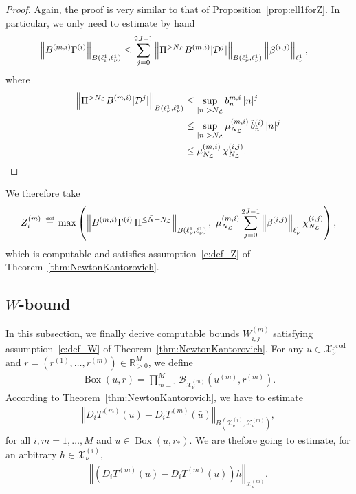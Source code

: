 \documentclass[10pt,a4paper]{article}
\theoremstyle{plain}
\newcommand{\RR}{\mathbb R}
\newcommand{\B}{\mathcal{B}}
\renewcommand{\B}{\mathcal{B}}
\renewcommand{\L}{\mathcal{L}}
\newcommand{\D}{\mathcal{D}}
\newcommand{\X}{\mathcal{X}}
\newcommand{\bu}{\bar{u}}
\newcommand{\bN}{\bar{N}}
\newcommand{\1}{\mathbf{1}}
\newcommand{\rstar}{r_*}
\newcommand{\pprod}{\mathrm{prod}}
\newcommand{\bydef}{\,\stackrel{\mbox{\tiny\textnormal{\raisebox{0ex}[0ex][0ex]{def}}}}{=}\,}
\DeclareMathOperator{\bbox}{Box}
\newcommand{\NL}{N_{\text{\tiny{$\L$}}}}
\begin{document}
%
\begin{proof}
Again, the proof is very similar to that of Proposition~\ref{prop:ell1forZ}. In particular, we only need to estimate by hand
\begin{align*}
\left\Vert B^{(m,i)}\Gamma^{(i)} \right\Vert_{B(\ell^1_\nu,\ell^1_\nu)} &\leq \sum_{j=0}^{2J-1} \left\Vert \Pi^{> \NL} B^{(m,i)} \vert \D^{j}\vert \right\Vert_{B(\ell^1_\nu,\ell^1_\nu)} \left\Vert \beta^{(i,j)}  \right\Vert_{\ell^1_\nu},
\end{align*}
where
\begin{align*}
\left\Vert \Pi^{> \NL} B^{(m,i)} \vert \D^{j}\vert \right\Vert_{B(\ell^1_\nu,\ell^1_\nu)} &\leq \sup_{\vert n\vert >\NL} b^{m,i}_n\, \vert n\vert^j \\
&\leq \sup_{\vert n\vert >\NL} \mu^{(m,i)}_{\NL}\, \tilde{b}^{(i)}_n\, \vert n\vert^j \\
&\leq  \mu^{(m,i)}_{\NL}\, \chi^{(i,j)}_{\NL}. \qedhere
\end{align*}
\end{proof}
We therefore take
\begin{align*}
Z^{(m)}_i \bydef \max \left(\left\Vert B^{(m,i)} \Gamma^{(i)} \,\Pi^{\leq \bN+\NL}\right\Vert_{B(\ell^1_\nu,\ell^1_\nu)},\ \mu^{(m,i)}_{\NL}\sum_{j=0}^{2J-1} \left\Vert \beta^{(i,j)}\right\Vert_{\ell^1_\nu}  \chi^{(i,j)}_{\NL} \right),
\end{align*}
which is computable and satisfies assumption~\eqref{e:def_Z} of Theorem~\ref{thm:NewtonKantorovich}.

\subsection{$W$-bound}
\label{sec:Wbounds_DD}

In this subsection, we finally derive computable bounds $W^{(m)}_{i,j}$ satisfying assumption~\eqref{e:def_W} of Theorem~\ref{thm:NewtonKantorovich}. For any $u\in\X^\pprod_\nu$ and $r=(r^{(1)},\ldots,r^{(m)}) \in \RR^M_{>0}$, we define 
\begin{align*}
\bbox(u,r) = \prod_{m=1}^M \B_{\X_\nu^{(m)}}\left(u^{(m)},r^{(m)}\right).
\end{align*}
According to Theorem~\ref{thm:NewtonKantorovich}, we have to estimate 
\begin{align*}
\left\Vert D_i T^{(m)}(u)- D_i T^{(m)}(\bu)\right\Vert_{B(\X_\nu^{(i)},\X_\nu^{(m)})},
\end{align*}
for all $i,m=1,\ldots,M$ and $u\in \bbox(\bu,\rstar)$. We are thefore going to estimate, for an arbitrary  $h\in\X_\nu^{(i)}$, 
\begin{align*}
\left\Vert \left(D_i T^{(m)}(u)- D_i T^{(m)}(\bu)\right) h\right\Vert_{\X_\nu^{(m)}}.
\end{align*}
\end{document}
